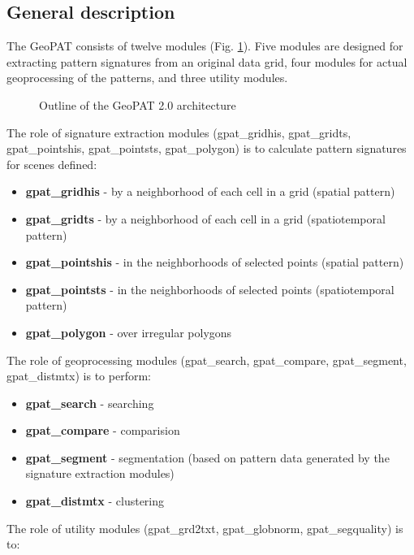 \subsection{General description}

The GeoPAT consists of twelve modules (Fig. \ref{FIG:GPAT}).
Five modules are designed for extracting pattern signatures from an original data grid, four modules for actual geoprocessing of the patterns, and three utility modules.

\begin{figure}[H]
 	\centering
	\caption{Outline of the GeoPAT 2.0 architecture}
	\label{FIG:GPAT} 
\end{figure}

The role of signature extraction modules (gpat\_gridhis, gpat\_gridts, gpat\_pointshis, gpat\_pointsts, gpat\_polygon) is to calculate pattern signatures for scenes defined:

\begin{itemize}
  \item \textbf{gpat\_gridhis} - by a neighborhood of each cell in a grid (spatial pattern)
  \item \textbf{gpat\_gridts} - by a neighborhood of each cell in a grid (spatiotemporal pattern)
  \item \textbf{gpat\_pointshis} - in the neighborhoods of selected points (spatial pattern)
  \item \textbf{gpat\_pointsts} - in the neighborhoods of selected points (spatiotemporal pattern)
  \item \textbf{gpat\_polygon} - over irregular polygons
\end{itemize}

The role of geoprocessing modules (gpat\_search, gpat\_compare, gpat\_segment, gpat\_distmtx) is to perform:

\begin{itemize}
  \item \textbf{gpat\_search} - searching
  \item \textbf{gpat\_compare} - comparision
  \item \textbf{gpat\_segment} - segmentation (based on pattern data generated by the signature extraction modules)
  \item \textbf{gpat\_distmtx} - clustering
\end{itemize}

The role of utility modules (gpat\_grd2txt, gpat\_globnorm, gpat\_segquality) is to:

